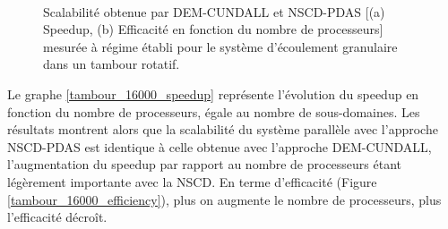\begin{figure}[h!]
\hspace{\fill}
   \\
\caption{\label{tambour_16000_speedup-efficiency}Scalabilité obtenue par DEM-CUNDALL et NSCD-PDAS [(a) Speedup, (b) Efficacité en fonction du nombre de processeurs] mesurée à régime établi pour le système d'écoulement granulaire dans un tambour rotatif.}
\end{figure}

Le graphe \ref{tambour_16000_speedup} représente l'évolution du speedup en fonction du nombre de processeurs, égale au nombre de sous-domaines. Les résultats montrent alors que la scalabilité du système parallèle avec l'approche NSCD-PDAS est identique à celle obtenue avec l'approche DEM-CUNDALL, l'augmentation du speedup par rapport au nombre de processeurs étant légèrement importante avec la NSCD. En terme d'efficacité (Figure \ref{tambour_16000_efficiency}), plus on augmente le nombre de processeurs, plus l'efficacité décroît.\\

